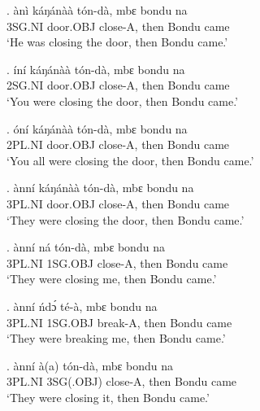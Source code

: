 \documentclass{assets/fieldnotes}
\begin{document}
\exg.
ànì      káŋánàà    tón-dà,    mbɛ    bondu   na   \\
3SG.NI   door.OBJ   close-A,   then   Bondu   came \\%
`He was closing the door, then Bondu came.' \label{22883}

\exg.
íní      káŋánàà    tón-dà,    mbɛ    bondu   na   \\
2SG.NI   door.OBJ   close-A,   then   Bondu   came \\%
`You were closing the door, then Bondu came.'

\exg.
óní      káŋánàà    tón-dà,    mbɛ    bondu   na   \\
2PL.NI   door.OBJ   close-A,   then   Bondu   came \\%
`You all were closing the door, then Bondu came.'

\exg.
ànní     káŋánàà    tón-dà,    mbɛ    bondu   na   \\
3PL.NI   door.OBJ   close-A,   then   Bondu   came \\%
`They were closing the door, then Bondu came.' \label{60205}


\exg.
ànní     ná        tón-dà,    mbɛ    bondu   na   \\
3PL.NI   1SG.OBJ   close-A,   then   Bondu   came \\%
`They were closing me, then Bondu came.'

\exg.
ànní     ńdɔ́       té-à,      mbɛ    bondu   na   \\
3PL.NI   1SG.OBJ   break-A,   then   Bondu   came \\%
`They were breaking me, then Bondu came.'

\exg.
ànní     à(a)        tón-dà,    mbɛ    bondu   na   \\
3PL.NI   3SG(.OBJ)   close-A,   then   Bondu   came \\%
`They were closing it, then Bondu came.'\label{28222}
\end{document}
